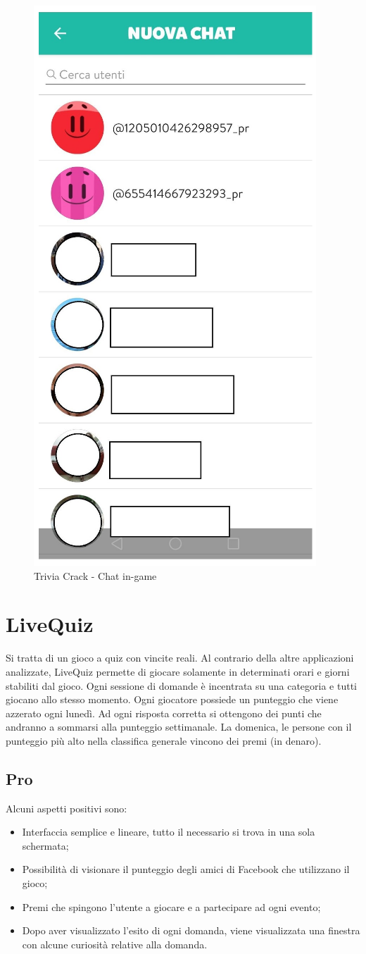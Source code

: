 \documentclass{article}
\begin{document}
\begin{figure}[htp]
\begin{center}
\includegraphics[width=0.5 \textwidth]{Figure3.png}
\caption{Trivia Crack - Chat in-game}
\end{center}
\end{figure}

\newpage

\section{LiveQuiz}
Si tratta di un gioco a quiz con vincite reali. Al contrario della altre applicazioni analizzate, LiveQuiz permette di giocare solamente in determinati orari e giorni stabiliti dal gioco. Ogni sessione di domande è incentrata su una categoria e tutti giocano allo stesso momento. Ogni giocatore possiede un punteggio che viene azzerato ogni lunedì. Ad ogni risposta corretta si ottengono dei punti che andranno a sommarsi alla punteggio settimanale. La domenica, le persone con il punteggio più alto nella classifica generale vincono dei premi (in denaro).

\subsection{Pro}
Alcuni aspetti positivi sono:
\begin{itemize}
\item Interfaccia semplice e lineare, tutto il necessario si trova in una sola schermata;
\item Possibilità di visionare il punteggio degli amici di Facebook che utilizzano il gioco;
\item Premi che spingono l'utente a giocare e a partecipare ad ogni evento;
\item Dopo aver visualizzato l’esito di ogni domanda, viene visualizzata una finestra con alcune curiosità relative alla domanda.
\end{itemize}
\end{document}
